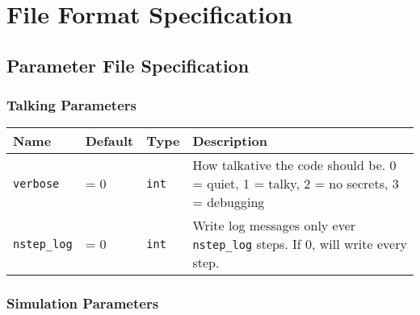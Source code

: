 \newpage
\section{File Format Specification}

\subsection{Parameter File Specification}\label{chap:paramfile}



\subsubsection{Talking Parameters}

\begin{tabular}[c]{p{2.5cm} p{1.5cm} p{} p{}}
Name & Default & Type & Description \\
\hline
\hline
\texttt{verbose} &
    = 0 &
    \texttt{int} &
    How talkative the code should be. 0 = quiet, 1 = talky, 2 = no secrets, 3 = debugging
\\ \hline
\texttt{nstep\_log} &
    = 0 &
    \texttt{int} &
    Write log messages only ever \texttt{nstep\_log} steps. If 0, will write every step.
\\ \hline
\end{tabular}






\subsubsection{Simulation Parameters}

